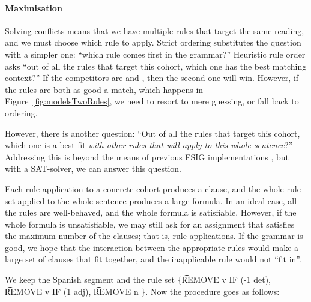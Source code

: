 \paragraph{Maximisation} 

Solving conflicts means that we have multiple rules that target the same reading, and we must choose which rule to apply.
Strict ordering substitutes the question with a simpler one: ``which rule comes first in the grammar?''
Heuristic rule order asks ``out of all the rules that target this cohort, which one has the best matching context?''
If the competitors are  and , then the second one will win. However, if the rules are both as good a match, which happens in Figure~\ref{fig:modelsTwoRules}, we need to resort to mere guessing, or fall back to ordering.

However, there is another question: ``Out of all the rules that target this cohort, which one is a best fit \emph{with other rules that will apply to this whole sentence}?''
Addressing this is beyond the means of previous FSIG implementations , but with a SAT-solver, we can answer this question. 


Each rule application to a concrete cohort produces a clause,
and the whole rule set applied to the whole sentence produces 
a large formula. In an ideal case, all the rules are well-behaved, 
and the whole formula is satisfiable. However, if the whole formula 
is unsatisfiable, we may still ask for an assignment that satisfies 
the maximum number of the clauses; that is, rule applications. 
If the grammar is good, we hope that the interaction between 
the appropriate rules would make a large set of clauses that 
fit together, and the inapplicable rule would not ``fit in''.


We keep the Spanish segment and the rule set $\{$\t{REMOVE v IF (-1 det)}, \t{REMOVE v IF (1 adj)}, \t{REMOVE n} $\}$.
Now the procedure goes as follows:

